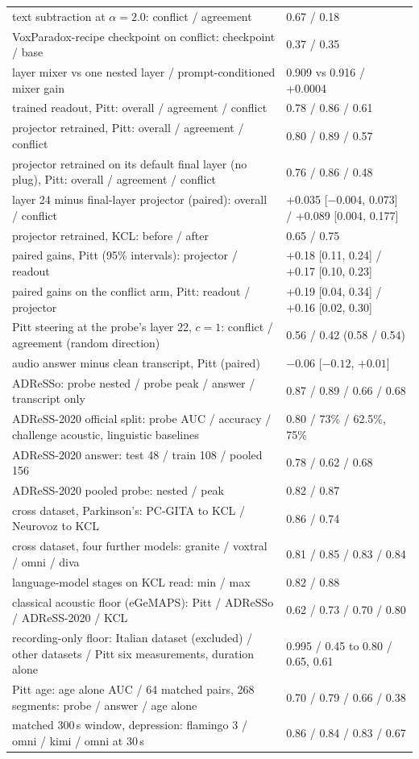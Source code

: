 \documentclass[conference]{IEEEtran}
\begin{document}
\begin{table}[!t]
\begin{tabular}{@{}p{}p{}@{}}
text subtraction at $\alpha = 2.0$: conflict / agreement & 0.67 / 0.18 \\
VoxParadox-recipe checkpoint on conflict: checkpoint / base & 0.37 / 0.35 \\
layer mixer vs one nested layer / prompt-conditioned mixer gain & 0.909 vs 0.916 / +0.0004 \\
trained readout, Pitt: overall / agreement / conflict & 0.78 / 0.86 / 0.61 \\
projector retrained, Pitt: overall / agreement / conflict & 0.80 / 0.89 / 0.57 \\
projector retrained on its default final layer (no plug), Pitt: overall / agreement / conflict & 0.76 / 0.86 / 0.48 \\
layer 24 minus final-layer projector (paired): overall / conflict & +0.035 [$-$0.004, 0.073] / +0.089 [0.004, 0.177] \\
projector retrained, KCL: before / after & 0.65 / 0.75 \\
paired gains, Pitt (95\% intervals): projector / readout & +0.18 [0.11, 0.24] / +0.17 [0.10, 0.23] \\
paired gains on the conflict arm, Pitt: readout / projector & +0.19 [0.04, 0.34] / +0.16 [0.02, 0.30] \\
Pitt steering at the probe's layer 22, $c=1$: conflict / agreement (random direction) & 0.56 / 0.42 (0.58 / 0.54) \\
audio answer minus clean transcript, Pitt (paired) & $-0.06$ [$-0.12$, $+0.01$] \\
ADReSSo: probe nested / probe peak / answer / transcript only & 0.87 / 0.89 / 0.66 / 0.68 \\
ADReSS-2020 official split: probe AUC / accuracy / challenge acoustic, linguistic baselines & 0.80 / 73\% / 62.5\%, 75\% \\
ADReSS-2020 answer: test 48 / train 108 / pooled 156 & 0.78 / 0.62 / 0.68 \\
ADReSS-2020 pooled probe: nested / peak & 0.82 / 0.87 \\
cross dataset, Parkinson's: PC-GITA to KCL / Neurovoz to KCL & 0.86 / 0.74 \\
cross dataset, four further models: granite / voxtral / omni / diva & 0.81 / 0.85 / 0.83 / 0.84 \\
language-model stages on KCL read: min / max & 0.82 / 0.88 \\
classical acoustic floor (eGeMAPS): Pitt / ADReSSo / ADReSS-2020 / KCL & 0.62 / 0.73 / 0.70 / 0.80 \\
recording-only floor: Italian dataset (excluded) / other datasets / Pitt six measurements, duration alone & 0.995 / 0.45 to 0.80 / 0.65, 0.61 \\
Pitt age: age alone AUC / 64 matched pairs, 268 segments: probe / answer / age alone & 0.70 / 0.79 / 0.66 / 0.38 \\
matched 300\,s window, depression: flamingo 3 / omni / kimi / omni at 30\,s & 0.86 / 0.84 / 0.83 / 0.67 \\
\bottomrule
\end{tabular}
\end{table}
\end{document}
